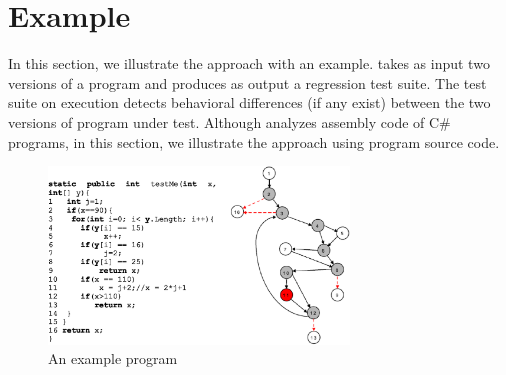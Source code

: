 \section{Example}
\label{sec:example}
In this section, we illustrate the  approach with an example.  takes as input two versions of a program and produces as output a regression test suite. The test suite on execution detects behavioral differences (if any exist) between the two versions of program under test. Although  analyzes assembly code of C\# programs, in this section, we illustrate the  approach using program source code. 


\begin{figure}[t]
\includegraphics[width=8cm, keepaspectratio]{Figures/examp}
\caption{An example program}
\label{fig:example}
\end{figure}

